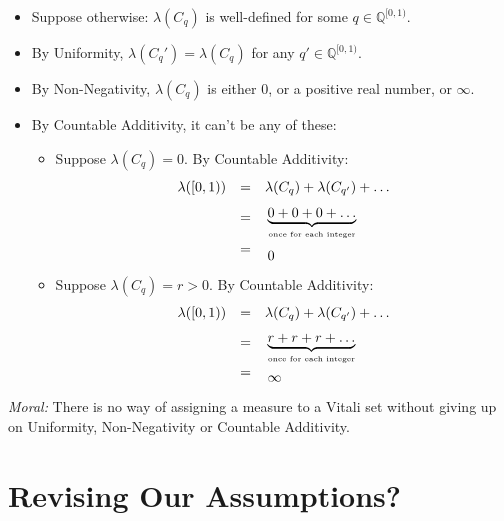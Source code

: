 \documentclass[12pt]{extarticle}
\begin{document}
\begin{itemize}
\item Suppose otherwise: $\lambda(C_q)$  is well-defined for some $q \in \mathbb{Q}^{[0,1)}$.  

\item By Uniformity, $\lambda(C_q') = \lambda(C_q)$ for any $q' \in \mathbb{Q}^{[0,1)}$.

\item By Non-Negativity, $\lambda(C_q)$ is either $0$, or a positive real number, or $\infty$.

\item By Countable Additivity, it can't be any of these:



\begin{itemize}
\item Suppose $\lambda(C_q) =0$. By Countable Additivity:
\[
\begin{array}{ccc}
\lambda([0,1)) &= &\lambda(C_q) + \lambda(C_{q'}) + \ldots\\
&= &\parbox{30mm}{\vspace{3mm}$\underbrace{0 + 0 + 0 + \ldots}_{\text{\tiny once for each integer}}$} \\
&= &\parbox{30mm}{\vspace{3mm}$0$}
\end{array}
\]


\item Suppose $\lambda(C_q) = r >0$. By Countable Additivity:
\[
\begin{array}{ccc}
\lambda([0,1)) &= &\lambda(C_q) + \lambda(C_{q'}) + \ldots\\
&= &\parbox{30mm}{\vspace{3mm}$\underbrace{r + r + r + \ldots}_{\text{\tiny once for each integer}}$} \\
&= &\parbox{30mm}{\vspace{3mm}$\infty$}
\end{array}
\]


\end{itemize}



\end{itemize}
\emph{Moral:} There is no way of assigning a measure to a Vitali set without giving up on Uniformity, Non-Negativity or Countable Additivity.


\section{Revising Our Assumptions?}
\end{document}
